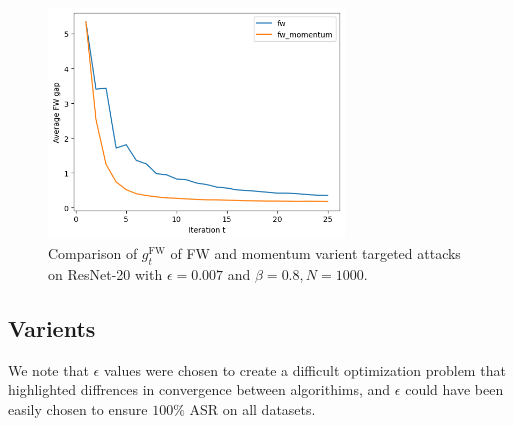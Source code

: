 \documentclass{article}
\begin{document}
\begin{figure}[H]
    \centering
    \includegraphics[width=0.7\textwidth]{plots/momentum.png}
    \caption{Comparison of $g_t^\text{FW}$ of FW and momentum varient targeted attacks on ResNet-20 with $\epsilon = 0.007$ and $\beta = 0.8, N = 1000$.}
    \label{fig:momentum}
\end{figure}

\subsection{Varients}

\begin{table}[H]
    \centering
    \caption{Attack Success Rate (ASR) and Average Iterations of Frank-Wolfe Algorithm and Variants for Targeted Adversarial Attacks on 1000 Examples from Three Datasets with $20$ maximum iterations and decaying stepsize rule.}
	\label{table:varients}
\end{table}
We note that $\epsilon$ values were chosen to create a difficult optimization problem that highlighted diffrences in convergence between algorithims, and $\epsilon$ could have been easily chosen to ensure $100\%$ ASR on all datasets.
\end{document}
